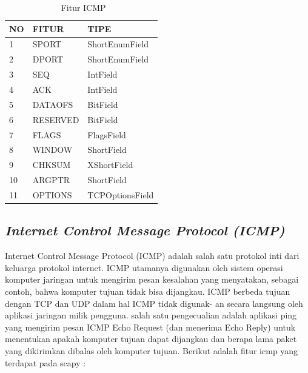	\begin{table}[H]
		\centering
		\caption{\ Fitur ICMP}
		\label{Fitur ICMP}
		\begin{tabular}{|l|l|l|}
			\hline
			NO & FITUR     & TIPE \\ \hline
			1  & SPORT    & ShortEnumField      \\ \hline
			2  & DPORT & ShortEnumField      \\ \hline
			3  & SEQ        & IntField      \\ \hline
			4  & ACK      & IntField      \\ \hline
			5  & DATAOFS    & BitField      \\ \hline
			6  & RESERVED & BitField      \\ \hline
			7  & FLAGS        & FlagsField      \\ \hline
			8  & WINDOW      & ShortField     \\ \hline
			9  & CHKSUM    & XShortField      \\ \hline
			10  & ARGPTR &  ShortField      \\ \hline
			11  & OPTIONS        & TCPOptionsField      \\ \hline
		
		\end{tabular}
	\end{table}


	\newpage
	\subsection{\emph{Internet Control Message Protocol (ICMP)}}
	
	 Internet Control Message Protocol (ICMP) adalah salah satu protokol inti dari
	 keluarga protokol internet. ICMP utamanya digunakan oleh sistem operasi komputer
	 jaringan untuk mengirim pesan kesalahan yang menyatakan, sebagai contoh, bahwa
	 komputer tujuan tidak bisa dijangkau.
	 ICMP berbeda tujuan dengan TCP dan UDP dalam hal ICMP tidak digunak-
	 an secara langsung oleh aplikasi jaringan milik pengguna. salah satu pengecualian
	 adalah aplikasi ping yang mengirim pesan ICMP Echo Request (dan menerima Echo
	 Reply) untuk menentukan apakah komputer tujuan dapat dijangkau dan berapa lama
	 paket yang dikirimkan dibalas oleh komputer tujuan. Berikut adalah fitur icmp yang
	 terdapat pada scapy :
	 
